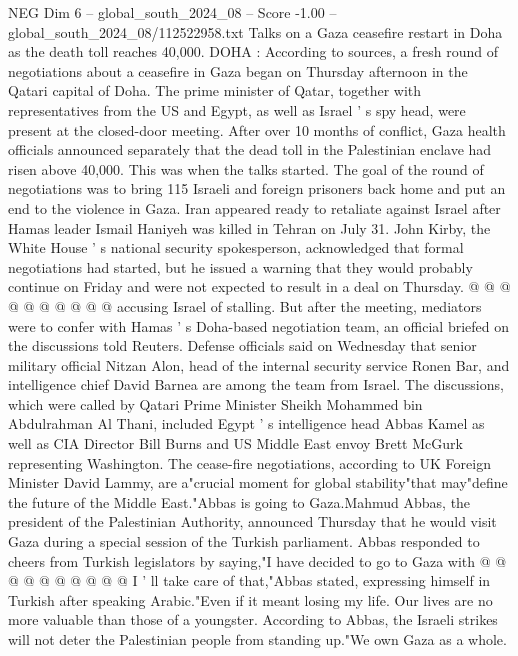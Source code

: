 \begin{textsample}{NEG Dim 6 – global\_south\_2024\_08 – Score -1.00 – global\_south\_2024\_08/112522958.txt}  \label{ex:f6_neg_064}
Talks on a Gaza ceasefire restart in Doha as the death toll reaches 40,000.
DOHA : According to sources, a fresh round of negotiations about a ceasefire in Gaza began on Thursday afternoon in the Qatari capital of Doha.
The prime minister of Qatar, together with representatives from the US and Egypt, as well as Israel ' s spy head, were present at the closed-door meeting.
After over 10 months of conflict, Gaza health officials announced separately that the dead toll in the Palestinian enclave had risen above 40,000.
This was when the talks started.
The goal of the round of negotiations was to bring 115 Israeli and foreign prisoners back home and put an end to the violence in Gaza.
Iran appeared ready to retaliate against Israel after Hamas leader Ismail Haniyeh was killed in Tehran on July 31.
John Kirby, the White House ' s national security spokesperson, acknowledged that formal negotiations had started, but he issued a warning that they would probably continue on Friday and were not expected to result in a deal on Thursday. @ @ @ @ @ @ @ @ @ @ accusing Israel of stalling.
But after the meeting, mediators were to confer with Hamas ' s Doha-based negotiation team, an official briefed on the discussions told Reuters.
Defense officials said on Wednesday that senior military official Nitzan Alon, head of the internal security service Ronen Bar, and intelligence chief David Barnea are among the team from Israel.
The discussions, which were called by Qatari Prime Minister Sheikh Mohammed bin Abdulrahman Al Thani, included Egypt ' s intelligence head Abbas Kamel as well as CIA Director Bill Burns and US Middle East envoy Brett McGurk representing Washington.
The cease-fire negotiations, according to UK Foreign Minister David Lammy, are a"crucial moment for global stability"that may"define the future of the Middle East."Abbas is going to Gaza.Mahmud Abbas, the president of the Palestinian Authority, announced Thursday that he would visit Gaza during a special session of the Turkish parliament.
Abbas responded to cheers from Turkish legislators by saying,"I have decided to go to Gaza with @ @ @ @ @ @ @ @ @ @ I ' ll take care of that,"Abbas stated, expressing himself in Turkish after speaking Arabic."Even if it meant losing my life.
Our lives are no more valuable than those of a youngster.
According to Abbas, the Israeli strikes will not deter the Palestinian people from standing up."We own Gaza as a whole.

\end{textsample}
